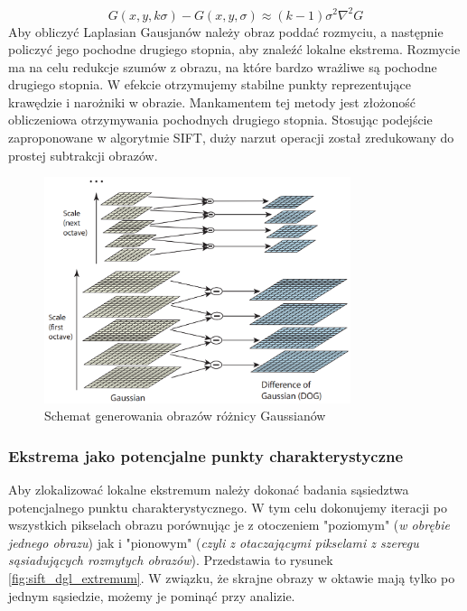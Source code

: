 \begin{equation}
G(x,y,k\sigma)-G(x,y,\sigma) \approx (k-1)\sigma^2{\nabla}^2 G
\end{equation}
Aby obliczyć Laplasian Gausjanów należy obraz poddać rozmyciu, a następnie policzyć jego pochodne drugiego stopnia, aby znaleźć lokalne ekstrema. Rozmycie ma na celu redukcje szumów z obrazu, na które bardzo wrażliwe są pochodne drugiego stopnia. W efekcie otrzymujemy stabilne punkty reprezentujące krawędzie i narożniki w obrazie. Mankamentem tej metody jest złożoność obliczeniowa otrzymywania pochodnych drugiego stopnia. Stosując podejście zaproponowane w algorytmie SIFT, duży narzut operacji został zredukowany do prostej subtrakcji obrazów.
\begin{figure}[!htb]
\centering
\includegraphics[width=0.8\textwidth]{pict/02/sift/sift_dgl_octave.png}
\caption{Schemat generowania obrazów różnicy Gaussianów}
\label{fig:sift_dgl_octave}
\end{figure}

\subsubsection{Ekstrema jako potencjalne punkty charakterystyczne}
Aby zlokalizować lokalne ekstremum należy dokonać badania sąsiedztwa potencjalnego punktu charakterystycznego. W tym celu dokonujemy iteracji po wszystkich pikselach obrazu porównując je z otoczeniem "poziomym" (\textit{w obrębie jednego obrazu}) jak i "pionowym" (\textit{czyli z otaczającymi pikselami z szeregu sąsiadujących rozmytych obrazów}). Przedstawia to rysunek \ref{fig:sift_dgl_extremum}. W związku, że skrajne obrazy w oktawie mają tylko po jednym sąsiedzie, możemy je pominąć przy analizie.

